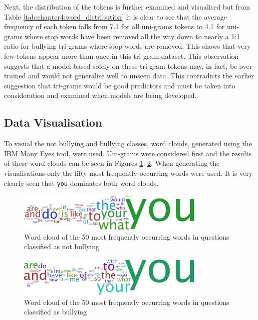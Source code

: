 Next, the distribution of the tokens is further examined and visualised but from Table \ref{tab:chapter4:word_distribution} it is clear to see that the average frequency of each token falls from 7.1 for all uni-grams tokens to 4.1 for uni-grams where stop words have been removed all the way down to nearly a 1:1 ratio for bullying tri-grams where stop words are removed. This shows that very few tokens appear more than once in this tri-gram dataset. This observation suggests that a model based solely on these tri-gram tokens may, in fact, be over trained and would not generalise well to unseen data. This contradicts the earlier suggestion that tri-grams would be good predictors and must be taken into consideration and examined when models are being developed.

\subsection{Data Visualisation}
To visual the not bullying and bullying classes, word clouds, generated using the IBM Many Eyes tool, were used. Uni-grams were considered first and the results of these word clouds can be seen in Figures \ref{fig:chapter4:not_bullying_wordcloud},  \ref{fig:chapter4:bullying_wordcloud}.  When generating the visualisations only the fifty most frequently occurring words were used. It is very clearly seen that \verb|you| dominates both word clouds.


\begin{figure}[!htb]
	\centering
	\includegraphics[width=0.8\textwidth]{Figures/Chapter4/not_bullying_wordcloud.jpg}
	\caption[Word cloud of not bullying words]{Word cloud of the 50 most frequently occurring words in questions classified as not bullying}
	\label{fig:chapter4:not_bullying_wordcloud}
\end{figure}

\begin{figure}[!htb]
	\centering
	\includegraphics[width=0.8\textwidth]{Figures/Chapter4/bullying_wordcloud.jpg}
	\caption[Word cloud of bullying words]{Word cloud of the 50 most frequently occurring words in questions classified as bullying}
	\label{fig:chapter4:bullying_wordcloud}
\end{figure}

